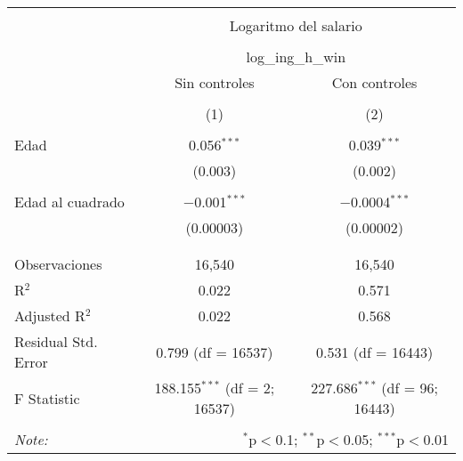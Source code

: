 
\begin{table}[!htbp] \centering 
  \caption{} 
  \label{} 
\begin{tabular}{@{\extracolsep{5pt}}lcc} 
\\[-1.8ex]\hline 
\hline \\[-1.8ex] 
 & \multicolumn{2}{c}{Logaritmo del salario} \\ 
\cline{2-3} 
\\[-1.8ex] & \multicolumn{2}{c}{log\_ing\_h\_win} \\ 
 & Sin controles & Con controles \\ 
\\[-1.8ex] & (1) & (2)\\ 
\hline \\[-1.8ex] 
 Edad & 0.056$^{***}$ & 0.039$^{***}$ \\ 
  & (0.003) & (0.002) \\ 
  & & \\ 
 Edad al cuadrado & $-$0.001$^{***}$ & $-$0.0004$^{***}$ \\ 
  & (0.00003) & (0.00002) \\ 
  & & \\ 
\hline \\[-1.8ex] 
Observaciones & 16,540 & 16,540 \\ 
R$^{2}$ & 0.022 & 0.571 \\ 
Adjusted R$^{2}$ & 0.022 & 0.568 \\ 
Residual Std. Error & 0.799 (df = 16537) & 0.531 (df = 16443) \\ 
F Statistic & 188.155$^{***}$ (df = 2; 16537) & 227.686$^{***}$ (df = 96; 16443) \\ 
\hline 
\hline \\[-1.8ex] 
\textit{Note:}  & \multicolumn{2}{r}{$^{*}$p$<$0.1; $^{**}$p$<$0.05; $^{***}$p$<$0.01} \\ 
\end{tabular} 
\end{table} 
